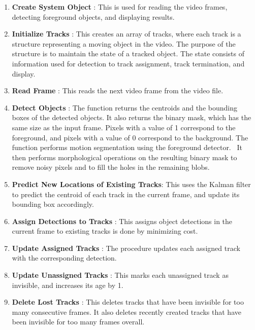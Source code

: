 \begin{enumerate}

    \item \textbf{Create System Object} : This is used for reading the video frames, detecting foreground objects, and displaying results. 
    
    \item \textbf{Initialize Tracks} : This creates an array of tracks, where each track is a structure representing a moving object in the video. The purpose of the structure is to maintain the state of a tracked object. The state consists of information used for detection to track assignment, track termination, and display. 
    
    \item \textbf{Read Frame} : This reads the next video frame from the video file. 
    
    \item \textbf{ Detect Objects} : The function returns the centroids and the bounding boxes of the detected objects. It also returns the binary mask, which has the same size as the input frame. Pixels with a value of 1 correspond to the foreground, and pixels with a value of 0 correspond to the background. The function performs motion segmentation using the foreground detector.~\cite{DBLP:conf/cvpr/StaufferG99} It then performs morphological operations on the resulting binary mask to remove noisy pixels and to fill the holes in the remaining blobs.
    
    \item \textbf{Predict New Locations of Existing Tracks}: This uses the Kalman filter to predict the centroid of each track in the current frame, and update its bounding box accordingly.
    
    \item \textbf{Assign Detections to Tracks} : This assigns object detections in the current frame to existing tracks is done by minimizing cost. ~\cite{Miller97optimizingmurty's,doi:10.1137/0105003}
    
    \item \textbf{Update Assigned Tracks} : The procedure updates each assigned track with the corresponding detection.
    
    \item \textbf{Update Unassigned Tracks} : This marks each unassigned track as invisible, and increases its age by 1.
    
    \item \textbf{Delete Lost Tracks} : This deletes tracks that have been invisible for too many consecutive frames. It also deletes recently created tracks that have been invisible for too many frames overall.
    

\end{enumerate}
